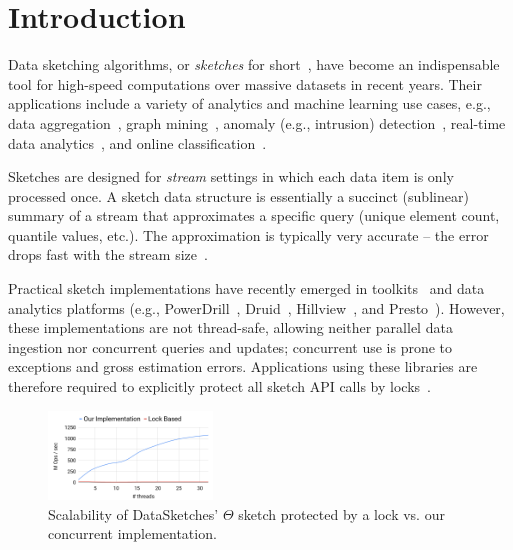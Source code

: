 \section{Introduction}

Data sketching algorithms, or \emph{sketches} for short~\cite{Cormode:2017}, have become 
an indispensable tool for high-speed computations over massive datasets in recent years. 
Their applications include a variety of analytics and machine learning use cases, e.g., data aggregation~\cite{Agarwal:2012, KMV}, 
graph mining~\cite{Cohen:2014},  anomaly (e.g., intrusion) detection~\cite{Yang:2018}, real-time data analytics~\cite{DruidHLL},
and online classification~\cite{Tai:2018}.

Sketches are designed for \emph{stream} settings in which each data item is only processed once. A sketch data structure 
is essentially a succinct (sublinear) summary of a stream that approximates a specific query (unique element count, quantile values, etc.). 
The approximation is typically 
very accurate -- the error drops fast with the stream size~\cite{Cormode:2017}. 

Practical sketch implementations have recently emerged in toolkits~\cite{DataSketches}
and data analytics platforms (e.g., PowerDrill~\cite{GoogleHLL:2013}, Druid~\cite{DruidHLL}, Hillview~\cite{VMWareHillview}, and Presto~\cite{PrestoHLL}). 
However, these implementations are not thread-safe, allowing neither
parallel data ingestion nor concurrent queries and updates; concurrent use is prone to exceptions and 
gross estimation errors. Applications using these libraries are therefore required to explicitly protect all sketch API calls by locks~\cite{lee-groups-post, lee-issue}.


\begin{figure}[tb]
\setlength{\abovecaptionskip}{0pt}
\setlength{\belowcaptionskip}{0pt}
\setlength\textfloatsep{0pt}
  \begin{center}
    \includegraphics[width=0.39\textwidth]{images/concurrentThetaGraph.png}
  \end{center}
  \caption{Scalability of DataSketches' $\Theta$ sketch 
   protected by a lock vs. our concurrent implementation.}
  \label{fig:performance}
\end{figure}


